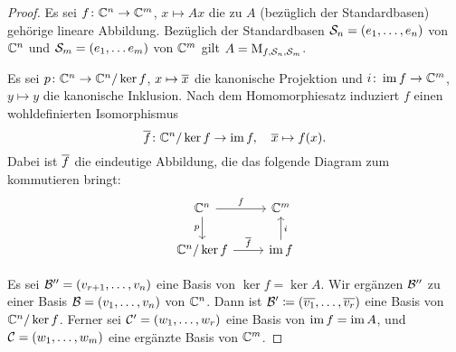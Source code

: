 \begin{proof}
  Es sei $f \colon \mathbb{C}^n \to \mathbb{C}^m$, $x \mapsto Ax$ die zu $A$ (bezüglich der Standardbasen) gehörige lineare Abbildung.
  Bezüglich der Standardbasen $\mathcal{S}_n = (e_1, \dotsc, e_n)$ von $\mathbb{C}^n$ und $\mathcal{S}_m = (e_1, \dotsc e_m)$ von $\mathbb{C}^m$ gilt $A = \operatorname{M}_{f, \mathcal{S}_n, \mathcal{S}_m}$.
  
  Es sei $p \colon \mathbb{C}^n \to \mathbb{C}^n / \ker f$, $x \mapsto \overline{x}$ die kanonische Projektion und $i \colon \operatorname{im} f \to \mathbb{C}^m$, $y \mapsto y$ die kanonische Inklusion.
  Nach dem Homomorphiesatz induziert $f$ einen wohldefinierten Isomorphismus
  \[
            \overline{f}
    \colon  \mathbb{C}^n / \ker f
    \to     \operatorname{im} f,
    \quad   \overline{x}
    \mapsto f(x).
  \]
  Dabei ist $\overline{f}$ die eindeutige Abbildung, die das folgende Diagram zum kommutieren bringt:
  \[
    \begin{tikzcd}
        \complex^n
        \arrow{r}{f}
        \arrow[swap]{d}{p}
      & \complex^m
      \\
        \complex^n / \ker f
        \arrow{r}{\induced{f}}
      & \im f
        \arrow[swap]{u}{i}
    \end{tikzcd}
  \]
  
  Es sei $\mathcal{B}'' = (v_{r+1}, \dotsc, v_n)$ eine Basis von $\ker f = \ker A$.
  Wir ergänzen $\mathcal{B}''$ zu einer Basis $\mathcal{B} = (v_1, \dotsc, v_n)$ von $\mathbb{C}^n$.
  Dann ist $\mathcal{B}' \coloneqq (\overline{v_1}, \dotsc, \overline{v_r})$ eine Basis von $\mathbb{C}^n / \ker f$.
  Ferner sei $\mathcal{C}' = (w_1, \dotsc, w_r)$ eine Basis von $\operatorname{im} f = \operatorname{im} A$, und $\mathcal{C} = (w_1, \dotsc, w_m)$ eine ergänzte Basis von $\mathbb{C}^m$.
  

\end{proof}
